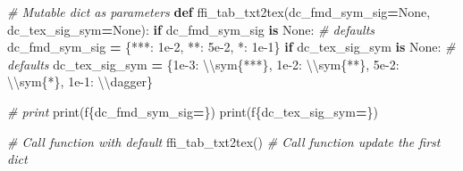 \documentclass[
]{book}
\newenvironment{Shaded}{\begin{snugshade}}{\end{snugshade}}
\newcommand{\BuiltInTok}[1]{#1}
\newcommand{\CharTok}[1]{\textcolor[rgb]{0.31,0.60,0.02}{#1}}
\newcommand{\CommentTok}[1]{\textcolor[rgb]{0.56,0.35,0.01}{\textit{#1}}}
\newcommand{\ControlFlowTok}[1]{\textcolor[rgb]{0.13,0.29,0.53}{\textbf{#1}}}
\newcommand{\FloatTok}[1]{\textcolor[rgb]{0.00,0.00,0.81}{#1}}
\newcommand{\KeywordTok}[1]{\textcolor[rgb]{0.13,0.29,0.53}{\textbf{#1}}}
\newcommand{\NormalTok}[1]{#1}
\newcommand{\OperatorTok}[1]{\textcolor[rgb]{0.81,0.36,0.00}{\textbf{#1}}}
\newcommand{\SpecialCharTok}[1]{\textcolor[rgb]{0.00,0.00,0.00}{#1}}
\newcommand{\SpecialStringTok}[1]{\textcolor[rgb]{0.31,0.60,0.02}{#1}}
\newcommand{\StringTok}[1]{\textcolor[rgb]{0.31,0.60,0.02}{#1}}
\newcommand{\VariableTok}[1]{\textcolor[rgb]{0.00,0.00,0.00}{#1}}
\begin{document}
\begin{Shaded}
\begin{Highlighting}[]
\CommentTok{\# Mutable dict as parameters}
\KeywordTok{def}\NormalTok{ ffi\_tab\_txt2tex(dc\_fmd\_sym\_sig}\OperatorTok{=}\VariableTok{None}\NormalTok{, dc\_tex\_sig\_sym}\OperatorTok{=}\VariableTok{None}\NormalTok{):}
    \ControlFlowTok{if}\NormalTok{ dc\_fmd\_sym\_sig }\KeywordTok{is} \VariableTok{None}\NormalTok{:}
        \CommentTok{\# defaults}
\NormalTok{        dc\_fmd\_sym\_sig }\OperatorTok{=}\NormalTok{ \{}\StringTok{\textquotesingle{}***\textquotesingle{}}\NormalTok{: }\FloatTok{1e{-}2}\NormalTok{, }\StringTok{\textquotesingle{}**\textquotesingle{}}\NormalTok{: }\FloatTok{5e{-}2}\NormalTok{, }\StringTok{\textquotesingle{}*\textquotesingle{}}\NormalTok{: }\FloatTok{1e{-}1}\NormalTok{\}}
    \ControlFlowTok{if}\NormalTok{ dc\_tex\_sig\_sym }\KeywordTok{is} \VariableTok{None}\NormalTok{:}
        \CommentTok{\# defaults}
\NormalTok{        dc\_tex\_sig\_sym }\OperatorTok{=}\NormalTok{ \{}\StringTok{\textquotesingle{}1e{-}3\textquotesingle{}}\NormalTok{: }\StringTok{\textquotesingle{}}\CharTok{\textbackslash{}\textbackslash{}}\StringTok{sym\{***\}\textquotesingle{}}\NormalTok{,}
                          \StringTok{\textquotesingle{}1e{-}2\textquotesingle{}}\NormalTok{: }\StringTok{\textquotesingle{}}\CharTok{\textbackslash{}\textbackslash{}}\StringTok{sym\{**\}\textquotesingle{}}\NormalTok{,}
                          \StringTok{\textquotesingle{}5e{-}2\textquotesingle{}}\NormalTok{: }\StringTok{\textquotesingle{}}\CharTok{\textbackslash{}\textbackslash{}}\StringTok{sym\{*\}\textquotesingle{}}\NormalTok{,}
                          \StringTok{\textquotesingle{}1e{-}1\textquotesingle{}}\NormalTok{: }\StringTok{\textquotesingle{}}\CharTok{\textbackslash{}\textbackslash{}}\StringTok{dagger\textquotesingle{}}\NormalTok{\}}

    \CommentTok{\# print}
    \BuiltInTok{print}\NormalTok{(}\SpecialStringTok{f\textquotesingle{}}\SpecialCharTok{\{}\NormalTok{dc\_fmd\_sym\_sig}\OperatorTok{=}\SpecialCharTok{\}}\SpecialStringTok{\textquotesingle{}}\NormalTok{)}
    \BuiltInTok{print}\NormalTok{(}\SpecialStringTok{f\textquotesingle{}}\SpecialCharTok{\{}\NormalTok{dc\_tex\_sig\_sym}\OperatorTok{=}\SpecialCharTok{\}}\SpecialStringTok{\textquotesingle{}}\NormalTok{)}
    
\CommentTok{\# Call function with default}
\NormalTok{ffi\_tab\_txt2tex()}
\CommentTok{\# Call function update the first dict }
\end{Highlighting}
\end{Shaded}
\end{document}
